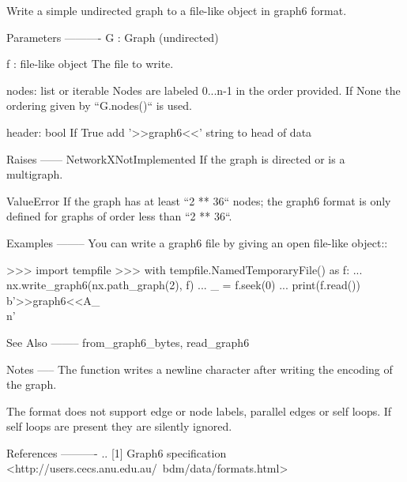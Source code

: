 \begin{DoxyVerb}Write a simple undirected graph to a file-like object in graph6 format.

Parameters
----------
G : Graph (undirected)

f : file-like object
   The file to write.

nodes: list or iterable
   Nodes are labeled 0...n-1 in the order provided.  If None the ordering
   given by ``G.nodes()`` is used.

header: bool
   If True add '>>graph6<<' string to head of data

Raises
------
NetworkXNotImplemented
    If the graph is directed or is a multigraph.

ValueError
    If the graph has at least ``2 ** 36`` nodes; the graph6 format
    is only defined for graphs of order less than ``2 ** 36``.

Examples
--------
You can write a graph6 file by giving an open file-like object::

    >>> import tempfile
    >>> with tempfile.NamedTemporaryFile() as f:
    ...     nx.write_graph6(nx.path_graph(2), f)
    ...     _ = f.seek(0)
    ...     print(f.read())
    b'>>graph6<<A_\\n'

See Also
--------
from_graph6_bytes, read_graph6

Notes
-----
The function writes a newline character after writing the encoding
of the graph.

The format does not support edge or node labels, parallel edges or
self loops.  If self loops are present they are silently ignored.

References
----------
.. [1] Graph6 specification
       <http://users.cecs.anu.edu.au/~bdm/data/formats.html>\end{DoxyVerb}
 